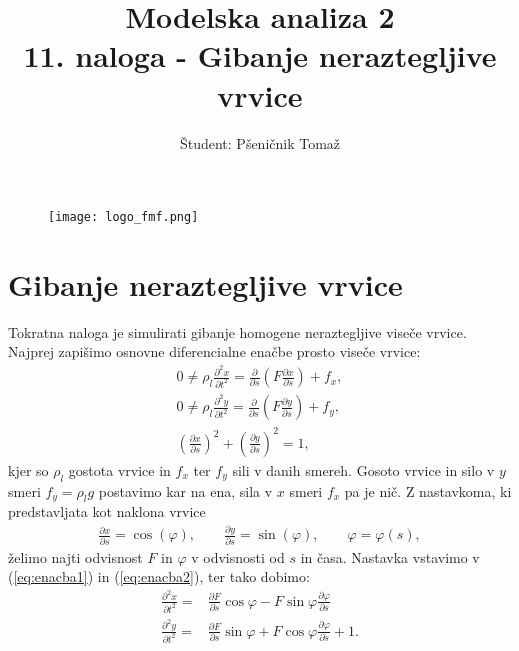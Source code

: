 \documentclass[12pt,a4paper]{article}
\title{\textbf{Modelska analiza 2} \\ 11. naloga - Gibanje neraztegljive vrvice \\}
\author{Študent: Pšeničnik Tomaž}
\begin{document}

	\begin{figure} [h]
  \centering
  \texttt{[image: logo\_fmf.png]}
  \maketitle
\end{figure}
	
	
	
	\newpage
	
	

\section*{Gibanje neraztegljive vrvice}

Tokratna naloga je simulirati gibanje homogene neraztegljive viseče vrvice. Najprej zapišimo osnovne diferencialne enačbe prosto viseče vrvice:
\begin{align}
0 \neq \rho _l \frac{\partial ^{2} x}{\partial t^{2}} = \frac{\partial}{\partial s} \left(F \frac{\partial x}{\partial s} \right) + f_x, \label{eq:enacba1} \\
0 \neq \rho _l \frac{\partial ^{2} y}{\partial t^{2}} = \frac{\partial}{\partial s} \left(F \frac{\partial y}{\partial s} \right) + f_y, \label{eq:enacba2} \\
\left(  \frac{\partial x}{\partial s}\right)^{2} + \left(  \frac{\partial y}{\partial s}\right)^{2} =1, \label{eq:enacba3}
\end{align}
kjer so $\rho _l $ gostota vrvice in $f_x$ ter $f_y$ sili v danih smereh. Gosoto vrvice in silo v $y$ smeri $f_y=\rho_l g$ postavimo kar na ena, sila v $x$ smeri $f_x$ pa je nič. Z nastavkoma, ki predstavljata kot naklona vrvice
\begin{align*}
\frac{\partial x}{ \partial s}= \cos (\varphi), \qquad \frac{\partial y}{ \partial s}= \sin (\varphi), \qquad \varphi = \varphi(s),
\end{align*}
želimo najti odvisnost $F$ in $\varphi$ v odvisnosti od $s$ in časa. Nastavka vstavimo v (\ref{eq:enacba1}) in (\ref{eq:enacba2}), ter tako dobimo:
\begin{align}
\frac{\partial ^{2} x}{\partial t^{2}} =& \frac{\partial F}{\partial s} \cos \varphi - F \sin \varphi \frac{ \partial \varphi}{\partial s} \label{eq:enacba4}\\
\frac{\partial ^{2} y}{\partial t^{2}} =& \frac{\partial F}{\partial s} \sin \varphi + F \cos \varphi \frac{ \partial \varphi}{\partial s} +1. \label{eq:enacba5}
\end{align}
\end{document}
